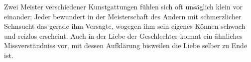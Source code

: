 Zwei Meister verschiedener Kunstgattungen fühlen sich oft unsäglich klein vor einander; Jeder bewundert in der Meisterschaft des Andern mit schmerzlicher Sehnsucht das gerade ihm Versagte, wogegen ihm sein eigenes Können schwach und reizlos erscheint. Auch in der Liebe der Geschlechter kommt ein ähnliches Missverständniss vor, mit dessen Aufklärung bisweilen die Liebe selber zu Ende ist.
\par

